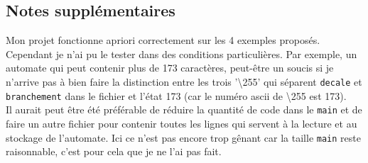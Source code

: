 \subsection{Notes supplémentaires}
Mon projet fonctionne apriori correctement sur les 4 exemples proposés. Cependant je n'ai pu le tester dans des conditions particulières. Par exemple, un automate qui peut contenir plus de 173 caractères, peut-être un soucis si je n'arrive pas à bien faire la distinction entre les trois '\textbackslash255' qui séparent \texttt{decale} et \texttt{branchement} dans le fichier et l'état 173 (car le numéro ascii de \textbackslash255 est 173).\\
Il aurait peut être été préférable de réduire la quantité de code dans le \texttt{main} et de faire un autre fichier pour contenir toutes les lignes qui servent à la lecture et au stockage de l'automate. Ici ce n'est pas encore trop gênant car la taille \texttt{main} reste raisonnable, c'est pour cela que je ne l'ai pas fait.
